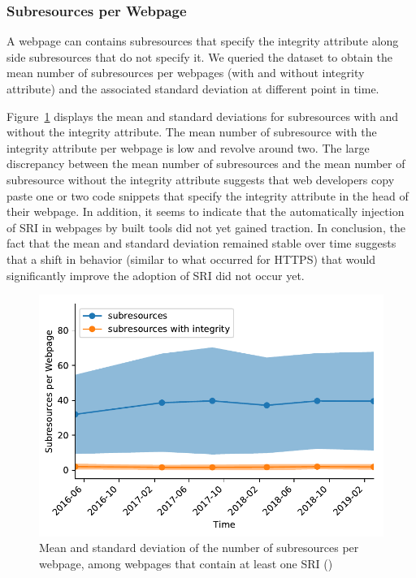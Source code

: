 \documentclass[sigconf,table]{acmart}
\begin{document}


\subsubsection{Subresources per Webpage}

A webpage can contains subresources that specify the integrity attribute along side subresources that do not specify it.
We queried the \CCSRI dataset to obtain the mean number of subresources per webpages (with and without integrity attribute) and the associated standard deviation at different point in time.

Figure~\ref{fig:03-evolution} displays the mean and standard deviations for subresources with and without the integrity attribute.
The mean number of subresource with the integrity attribute per webpage is low and revolve around two.
The large discrepancy between the mean number of subresources and the mean number of subresource without the integrity attribute suggests that web developers copy paste one or two code snippets that specify the integrity attribute in the head of their webpage.
In addition, it seems to indicate that the automatically injection of SRI in webpages by built tools did not yet gained traction.
In conclusion, the fact that the mean and standard deviation remained stable over time suggests that a shift in behavior (similar to what occurred for HTTPS) that would significantly improve the adoption of SRI did not occur yet.

\begin{figure}[h]
	\includegraphics[width=\columnwidth]{../../notebooks/03_pages_per_sri_evolution}
	\caption{Mean and standard deviation of the number of subresources per webpage, among webpages that contain at least one SRI (\CCUrlSriP)}
	\label{fig:03-evolution}
\end{figure}
\end{document}
